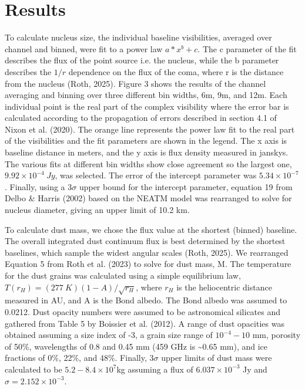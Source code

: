 \section{Results}\label{results}

To calculate nucleus size, the individual baseline visibilities, averaged over channel and binned, were fit to a power law \(a*x^{b} + c\). The c parameter of the fit describes the flux of the point source i.e. the nucleus, while the b parameter describes the \(1/r\) dependence on the flux of the coma, where r is the distance from the nucleus (Roth, 2025). Figure 3 shows the results of the channel averaging and binning over three different bin widths, 6m, 9m, and 12m. Each individual point is the real part of the complex visibility where the error bar is calculated according to the propagation of errors described in section 4.1 of Nixon et al. (2020). The orange line represents the power law fit to the real part of the visibilities and the fit parameters are shown in the legend. The x axis is baseline distance in meters, and the y axis is flux density measured in janskys. The various fits at different bin widths show close agreement so the largest one, \(9.92 \times 10^{- 4}\ Jy\), was selected. The error of the intercept parameter was \(5.34 \times 10^{- 7}\). Finally, using a $3\sigma$ upper bound for the intercept parameter, equation 19 from Delbo \& Harris (2002) based on the NEATM model was rearranged to solve for nucleus diameter, giving an upper limit of 10.2 km.

To calculate dust mass, we chose the flux value at the shortest (binned) baseline. The overall integrated dust continuum flux is best determined by the shortest baselines, which sample the widest angular scales (Roth, 2025). We rearranged Equation 5 from Roth et al. (2023) to solve for dust mass, M. The temperature for the dust grains was calculated using a simple equilibrium law, \(T\left( r_{H} \right) = (277\ K)(1 - A)/\sqrt{r_{H}}\), where \(r_{H}\) is the heliocentric distance measured in AU, and A is the Bond albedo. The Bond albedo was assumed to 0.0212. Dust opacity numbers were assumed to be astronomical silicates and gathered from Table 5 by Boissier et al. (2012). A range of dust opacities was obtained assuming a size index of -3, a grain size range of \(10^{- 4} - 10\) mm, porosity of 50\%, wavelengths of 0.8 and 0.45 mm (459 GHz is \textasciitilde0.65 mm), and ice fractions of 0\%, 22\%, and 48\%. Finally, $3\sigma$ upper limits of dust mass were calculated to be \(5.2 - 8.4 \times 10^{7}\)kg assuming a flux of \(6.037 \times 10^{- 3}\) Jy and \(\sigma = 2.152 \times 10^{- 3}\).
